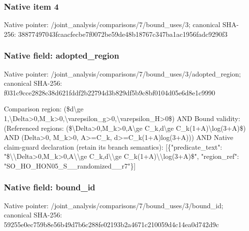 \documentclass[10pt,a4paper]{article}
\begin{document}
\subsubsection{Native item 4}
Native pointer: /joint\_\allowbreak{}analysis/comparisons/7/bound\_\allowbreak{}uses/3; canonical SHA-256: 38877497043fcaacfecbe7f0072be59de48b18767c347ba1ac1956fadc9290f3

\subsubsection{Native field: adopted\_\allowbreak{}region}
Native pointer: /joint\_\allowbreak{}analysis/comparisons/7/bound\_\allowbreak{}uses/3/adopted\_\allowbreak{}region; canonical SHA-256: f031c9cce2828c38d621fddf2b22794d3b829df5b9c8bf0104d05e6d8e1c9990

\begingroup\raggedright\sloppy Comparison region:\allowbreak{} (\$d\textbackslash{}ge 1,\allowbreak{}\textbackslash{}Delta>0,\allowbreak{}M\_\allowbreak{}k>0,\allowbreak{}\textbackslash{}varepsilon\_\allowbreak{}g>0,\allowbreak{}\textbackslash{}varepsilon\_\allowbreak{}H>0\$) AND Bound validity:\allowbreak{} (Referenced regions:\allowbreak{} (\$\textbackslash{}Delta>0,\allowbreak{}M\_\allowbreak{}k>0,\allowbreak{}A\textbackslash{}ge C\_\allowbreak{}k,\allowbreak{}d\textbackslash{}ge C\_\allowbreak{}k(1+A)\textbackslash{}log(3+A)\$) AND (Delta>0,\allowbreak{} M\_\allowbreak{}k>0,\allowbreak{} A>=\allowbreak{}C\_\allowbreak{}k,\allowbreak{} d>=\allowbreak{}C\_\allowbreak{}k(1+A)log(3+A))) AND Native claim-guard declaration (retain its branch semantics):\allowbreak{} [\{"predicate\_\allowbreak{}text":\allowbreak{} "\$\textbackslash{}\textbackslash{}Delta>0,\allowbreak{}M\_\allowbreak{}k>0,\allowbreak{}A\textbackslash{}\textbackslash{}ge C\_\allowbreak{}k,\allowbreak{}d\textbackslash{}\textbackslash{}ge C\_\allowbreak{}k(1+A)\textbackslash{}\textbackslash{}log(3+A)\$",\allowbreak{} "region\_\allowbreak{}ref":\allowbreak{} "SO\_\allowbreak{}HO\_\allowbreak{}HON05\_\allowbreak{}S\_\allowbreak{}\_\allowbreak{}randomized\_\allowbreak{}\_\allowbreak{}r7"\}]\par\endgroup

\subsubsection{Native field: bound\_\allowbreak{}id}
Native pointer: /joint\_\allowbreak{}analysis/comparisons/7/bound\_\allowbreak{}uses/3/bound\_\allowbreak{}id; canonical SHA-256: 59255e0ec759b8e56b49d7b6c288fe02193b2a4671c210059d4c14ea0d742d9c
\end{document}
